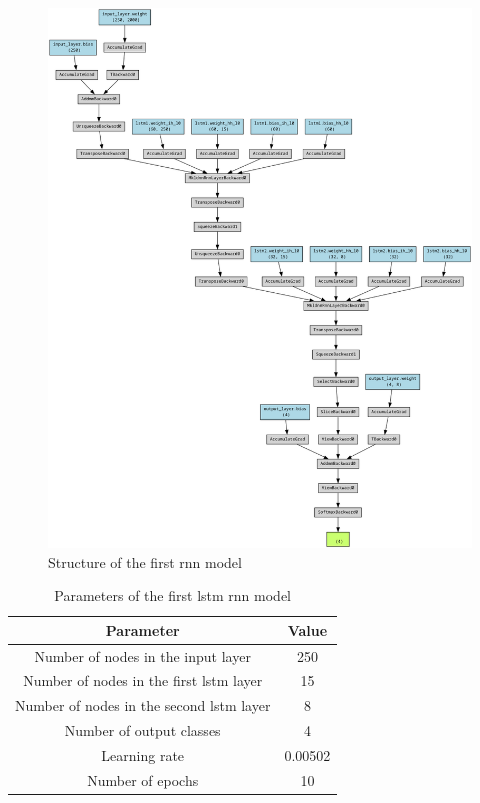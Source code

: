 \begin{figure}[h]
    \centering
    \includegraphics[scale=0.25]{images/rnn_struct.png}
    \caption{Structure of the first \acrshort{rnn} model}
    \label{fig:rnn_struct}
\end{figure}

\begin{table}[h]
    \centering
    \begin{tabular}{|c|c|}
        \hline
        \textbf{Parameter} & \textbf{Value} \\ \hline
        Number of nodes in the input layer & 250 \\ \hline
        Number of nodes in the first \acrshort{lstm} layer & 15 \\ \hline
        Number of nodes in the second \acrshort{lstm} layer & 8 \\ \hline
        Number of output classes & 4 \\ \hline
        Learning rate & 0.00502 \\ \hline
        Number of epochs & 10 \\ \hline
    \end{tabular}
    \caption{Parameters of the first \acrshort{lstm} \acrshort{rnn} model}
    \label{table:rnn_params}
\end{table}

